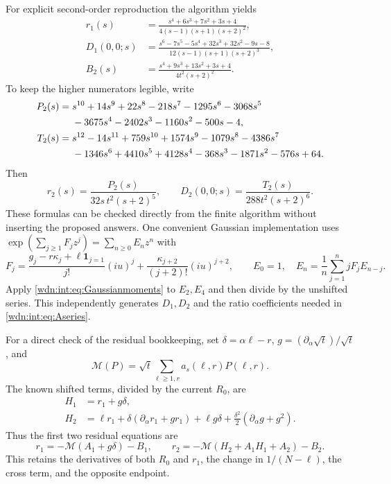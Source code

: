 \documentclass[11pt,letterpaper]{article}
\theoremstyle{remark}\newtheorem{remark}[theorem]{Remark}
\begin{document}
For explicit second-order reproduction the algorithm yields
\begin{align}
 r_1(s)&=\frac{s^4+6s^3+7s^2+3s+4}
                    {4(s-1)(s+1)(s+2)^2},\label{wdn:int:eq:r1}\\
 D_1(0,0;s)&=\frac{s^6-7s^5-5s^4+32s^3+32s^2-9s-8}
                    {12(s-1)(s+1)(s+2)^3},\label{wdn:int:eq:D1}\\
 B_2(s)&=\frac{s^4+9s^3+13s^2+3s+4}{4t^2(s+2)^2}.
 \label{wdn:int:eq:B2}
\end{align}
To keep the higher numerators legible, write
\begin{align}
 P_2(s)={}&s^{10}+14s^9+22s^8-218s^7-1295s^6-3068s^5\notag\\
          &-3675s^4-2402s^3-1160s^2-500s-4,\label{wdn:int:eq:P2}\\
 T_2(s)={}&s^{12}-14s^{11}+759s^{10}+1574s^9-1079s^8-4386s^7\notag\\
          &-1346s^6+4410s^5+4128s^4-368s^3-1871s^2-576s+64.
 \label{wdn:int:eq:T2}
\end{align}
Then
\begin{equation}\label{wdn:int:eq:r2D2}
 r_2(s)=\frac{P_2(s)}{32s\,t^2(s+2)^5},\qquad
 D_2(0,0;s)=\frac{T_2(s)}{288t^2(s+2)^6}.
\end{equation}
These formulas can be checked directly from the finite algorithm without
inserting the proposed answers. One convenient Gaussian implementation
uses $\exp(\sum_{j\ge1}F_jz^j)=\sum_{n\ge0}E_nz^n$ with
\[
 F_j=\frac{g_j-r\kappa_j+\ell\mathbf1_{j=1}}{j!}(iu)^j
       +\frac{\kappa_{j+2}}{(j+2)!}(iu)^{j+2},\qquad
 E_0=1,\quad E_n=\frac1n\sum_{j=1}^n jF_jE_{n-j}.
\]
Apply \eqref{wdn:int:eq:Gaussianmoments} to $E_2,E_4$ and then divide by the
unshifted series. This independently generates $D_1,D_2$ and the ratio
coefficients needed in \eqref{wdn:int:eq:Aseries}.

For a direct check of the residual bookkeeping, set
$\delta=\alpha\ell-r$, $g=(\partial_\alpha\sqrt t)/\sqrt t$, and
\[
 \mathcal M(P)=\sqrt t\sum_{\ell\ge1,r}a_s(\ell,r)P(\ell,r).
\]
The known shifted terms, divided by the current $R_0$, are
\begin{align*}
 H_1&=r_1+g\delta,\\
 H_2&=\ell r_1+\delta(\partial_\alpha r_1+gr_1)
       +\ell g\delta+\frac{\delta^2}{2}(\partial_\alpha g+g^2).
\end{align*}
Thus the first two residual equations are
\begin{equation}\label{wdn:int:eq:explicitresiduals}
 r_1=-\mathcal M(A_1+g\delta)-B_1,\qquad
 r_2=-\mathcal M(H_2+A_1H_1+A_2)-B_2.
\end{equation}
This retains the derivatives of both $R_0$ and $r_1$, the change in
$1/(N-\ell)$, the cross term, and the opposite endpoint.
\end{document}
